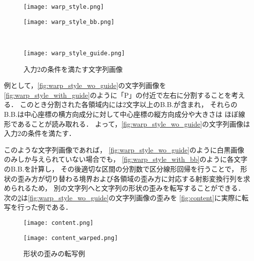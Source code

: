 \documentclass[autodetect-engine,dvi=dvipdfmx,ja=standard,a4j,jbase=10.5pt,twoside,twocolumn,magstyle=nomag*]{bxjsarticle}
\begin{document}
\begin{figure}[h]
    \centering
    \begin{minipage}[b]{0.48\linewidth}
        \centering
        \texttt{[image: warp\_style.png]}
        \label{fig:warp_style_wo_guide}
    \end{minipage}
    \begin{minipage}[b]{0.48\linewidth}
        \centering
        \texttt{[image: warp\_style\_bb.png]}
        \label{fig:warp_style_with_bb}
    \end{minipage}
    \\
    \begin{minipage}[b]{0.7\linewidth}
        \centering
        \texttt{[image: warp\_style\_guide.png]}
        \label{fig:warp_style_with_guide}
    \end{minipage}
    \caption{入力2の条件を満たす文字列画像}
    \label{fig:warp_style}
\end{figure}

例として，\cref{fig:warp_style_wo_guide}の文字列画像を
\cref{fig:warp_style_with_guide}のように「P」の付近で左右に分割することを考える．
このとき分割された各領域内には2文字以上のB.B.が含まれ，
それらのB.B.は中心座標の横方向成分に対して中心座標の縦方向成分や大きさは
ほぼ線形であることが読み取れる．
よって，\cref{fig:warp_style_wo_guide}の文字列画像は入力2の条件を満たす．

このような文字列画像であれば，
\cref{fig:warp_style_wo_guide}のように白黒画像のみしか与えられていない場合でも，
\cref{fig:warp_style_with_bb}のように各文字のB.B.を計算し，
その後適切な区間の分割数で区分線形回帰を行うことで，
形状の歪み方が切り替わる境界および各領域の歪み方に対応する射影変換行列を求められるため，
別の文字列へと文字列の形状の歪みを転写することができる．
次の\cref{fig:warp_transfer_eg}は\cref{fig:warp_style_wo_guide}の文字列画像の歪みを
\cref{fig:content}に実際に転写を行った例である．

\begin{figure}[h]
    \centering
    \begin{minipage}[b]{0.48\linewidth}
        \centering
        \texttt{[image: content.png]}
        \label{fig:content}
    \end{minipage}
    \begin{minipage}[b]{0.48\linewidth}
        \centering
        \texttt{[image: content\_warped.png]}
        \label{fig:content_warped}
    \end{minipage}
    \caption{形状の歪みの転写例}
    \label{fig:warp_transfer_eg}
\end{figure}
\end{document}
